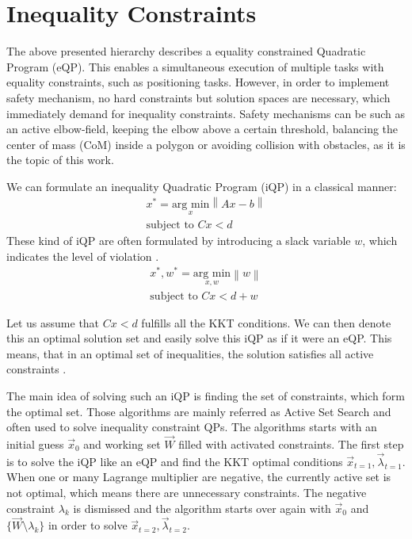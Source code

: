 \section{Inequality Constraints}
The above presented hierarchy describes a equality constrained Quadratic Program (eQP). This enables a simultaneous execution of multiple tasks with equality constraints, such as positioning tasks. However, in order to implement safety mechanism, no hard constraints but solution spaces are necessary, which immediately demand for inequality constraints. Safety mechanisms can be such as an active elbow-field, keeping the elbow above a certain threshold, balancing the center of mass (CoM) inside a polygon or avoiding collision with obstacles, as it is the topic of this work.

We can formulate an inequality Quadratic Program (iQP) in a classical manner:
\begin{eqnarray}
x^* =  \underset{x}{\text{arg min}} \left\| Ax - b \right \| \\
\text{subject to } Cx < d
\end{eqnarray} 
\newpage
These kind of iQP are often formulated by introducing a slack variable $w$, which indicates the level of violation \cite{kanoun:inria-00390581}. 
\begin{eqnarray} \label{eqn:ikineq}
x^*, w^* =  \underset{x,w}{\text{arg min}} \left\| w \right \| \\
\text{subject to } Cx < d + w
\end{eqnarray} 

Let us assume that $Cx <d$ fulfills all the KKT \cite{kuhn50nonlinear} conditions. We can then denote this an optimal solution set and easily solve this iQP as if it were an eQP. This means, that in an optimal set of inequalities, the solution satisfies all active constraints \cite{escande-icra-10}.

The main idea of solving such an iQP is finding the set of constraints, which form the optimal set. Those algorithms are mainly referred as Active Set Search \cite{GVK502988711} and often used to solve inequality constraint QPs. The algorithms starts with an initial guess $\vec{x}_0$ and working set $\vec{W}$ filled with activated constraints. The first step is to solve the iQP like an eQP and find the KKT optimal conditions $\vec{x}_{t=1}, \vec{\lambda}_{t=1}$. When one or many Lagrange multiplier are negative, the currently active set is not optimal, which means there are unnecessary constraints. The negative constraint $\lambda_k$ is dismissed and the algorithm starts over again with $\vec{x}_0$ and $\{ \vec{W} \setminus \lambda_k \}$ in order to solve $\vec{x}_{t=2}, \vec{\lambda}_{t=2}$. 

